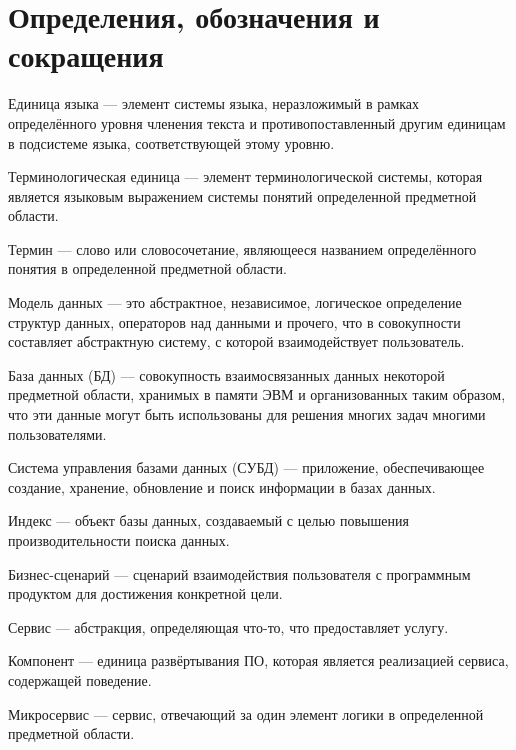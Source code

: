 \section*{Определения, обозначения и сокращения}

Единица языка --- элемент системы языка, неразложимый в рамках определённого уровня членения текста и противопоставленный другим единицам в подсистеме языка, соответствующей этому уровню.

Терминологическая единица --- элемент терминологической системы, которая является языковым выражением системы понятий определенной предметной области.

Термин --- слово или словосочетание, являющееся названием определённого понятия в определенной предметной области.

Модель данных --- это абстрактное, независимое, логическое определение структур данных, операторов над данными и прочего, что в совокупности составляет абстрактную систему, с которой взаимодействует пользователь.

База данных (БД) --- совокупность взаимосвязанных данных некоторой предметной области, хранимых в памяти ЭВМ и организованных таким образом, что эти данные могут быть использованы для решения многих задач многими пользователями.


Система управления базами данных (СУБД) --- приложение, обеспечивающее создание, хранение, обновление и поиск информации в базах данных.

Индекс --- объект базы данных, создаваемый с целью повышения производительности поиска данных.

Бизнес-сценарий --- сценарий взаимодействия пользователя с программным продуктом для достижения конкретной цели.

Сервис --- абстракция, определяющая что-то, что предоставляет услугу.

Компонент --- единица развёртывания ПО, которая является реализацией сервиса, содержащей поведение.

Микросервис --- сервис, отвечающий за один элемент логики в определенной предметной области.

\pagebreak
